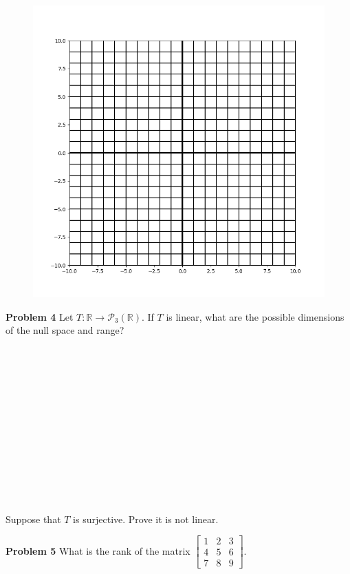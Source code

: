 \documentclass[12pt]{article}
\newcommand{\problem}[1]{\hspace{-4 ex} \large \textbf{Problem #1} }
\newcommand{\RR}{\mathbb{R}}
\newcommand{\PP}{\mathcal{P}}
\begin{document}
\begin{figure}[H]
	\includegraphics[width=.8\textwidth]{cartesian_grid}
	\centering
\end{figure}

\pagebreak
\problem{4} Let $T: \RR \to \PP_3(\RR)$. If $T$ is linear, what are the possible dimensions of the null space and range?
\\ \\ \\ \\ \\ \\ \\ \\ \\ \\ \\ \\ \\ \\

Suppose that $T$ is surjective. Prove it is not linear.

\pagebreak
\problem{5} What is the rank of the matrix $\begin{bmatrix}1 & 2 & 3 \\ 4 & 5 & 6 \\ 7 & 8 & 9 \end{bmatrix}$.
\end{document}
